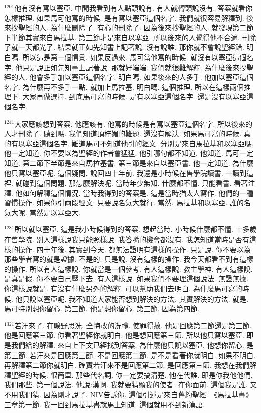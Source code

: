 \documentclass{book}
\begin{document}
$^{1201}$他有沒有寫以塞亞.
中間我看到有人點頭說有.
有人就轉頭說沒有.
答案就看你怎樣推理.
如果馬可他寫的時候.
是有寫以塞亞這個名字.
我們就很容易解釋到.
後來抄聖經的人.
為什麼刪除了.
有心的刪除了.
因為後來抄聖經的人.
就發現第二節下半節其實來自馬拉基.
第三節才是來自以塞亞.
所以後來的人覺得他不合適.
刪除了就一天都光了.
結果就正如先知書上記著說.
沒有說誰.
那你就不會說聖經錯.
明白嗎.
所以這是第一個情景.
如果反過來.
馬可當他寫的時候.
就沒有以塞亞這個名字.
他只是說正如先知書上記著說.
那就好端端.
我們就很難解釋.
為什麼後來抄聖經的人.
他會多手加以塞亞這個名字.
明白嗎.
如果後來的人多手.
他加以塞亞這個名字.
為什麼再不多手一點.
就加上馬拉基.
明白嗎.
這個推理.
所以在這樣兩個推理下.
大家再做選擇.
到底馬可寫的時候.
是有以塞亞這個名字.
還是沒有以塞亞這個名字.

$^{1241}$大家應該想到答案.
他應該有.
他寫的時候是有寫以塞亞這個名字.
所以後來的人才刪除了.
聽到嗎.
我們知道頂梓媚的難題.
還沒有解決.
如果馬可寫的時候.
真的有以塞亞這個名字.
難道馬可不知道他引的經文.
分別是來自馬拉基和以塞亞嗎.
他一定知道.
你不要以為聖經的作者會猛猛.
他引哪句都不知道.
他知道.
馬可一定知道.
第二節下半節是來自馬拉基書.
第三節是來自以塞亞書.
他一定知道.
為什麼他只寫以塞亞呢.
這個疑問.
說回四十年前.
我還是小時候在售學院讀書.
一讀到這裡.
就碰到這個問題.
那怎麼解決呢.
當時年少無知.
什麼都不懂.
只能看書.
看著注釋.
他如何解釋這個情況.
當時我得到的答案是.
這是當時猶太人寫作.
他們的一種習慣操作.
如果你引兩段經文.
只要說名氣大就行.
當然.
馬拉基和以塞亞.
誰的名氣大呢.
當然是以塞亞大.

$^{1281}$所以就以塞亞.
這是我小時候得到的答案.
想起當時.
小時候什麼都不懂.
十多歲在售學院.
別人這樣說我只能照樣說.
我答嘴的機會都沒有.
我怎知道當時是否有這樣的操作.
四十年後.
其實到今天.
都無法證明有這樣的操作.
只是說.
你不要以為那些學者寫的就是證據.
不是的.
只是說.
沒有這樣的操作.
我今天都看不到有這樣的操作.
所以有人這樣說.
你就當是一個參考.
有人這樣說.
教主學神.
有人這樣說.
是真是假.
你不要自己壓下去.
有人這樣說.
如果我們不要理這個說法.
無證無據.
你這樣說就是.
有沒有什麼另外的解釋.
可以幫助我們去明白.
為什麼馬可寫的時候.
他只說以塞亞呢.
我不知道大家能否想到解決的方法.
其實解決的方法.
就是.
馬可特別想你留心.
第三節.
他是想你留心.
第三節.
因為第四節.

$^{1321}$若汗來了.
在曠野思洗.
全悔改的洗禮.
使罪得赦.
他是回應第二節還是第三節.
他是回應第三節.
你看著聖經你就明白.
他是想回應第三節.
所以他只寫以塞亞.
即是我們給的解釋.
來自上下文已經找到答案.
為什麼他只說以塞亞.
他想你留心.
是第三節.
若汗來是回應第三節.
不是回應第二節.
是不是看著你就明白.
如果不明白.
再解釋第二節你就明白.
確實若汗來不是回應第二節.
是回應第三節.
我想在我們解釋聖經的時候.
很簡單.
那些代名詞.
你一定要搞清楚.
他在代誰.
即是你我他他們.
我們那些.
第一個說法.
他說:漢啊.
我就要猜顯我的使者.
在你面前.
這個我是誰.
又不用我們猜.
因為剛才說了.
NIV告訴你.
這個引述是來自舊約聖經.
《馬拉基書》三章第一節.
我一回到馬拉基書就馬上知道.
這個就用不到新漢語.
\end{document}
